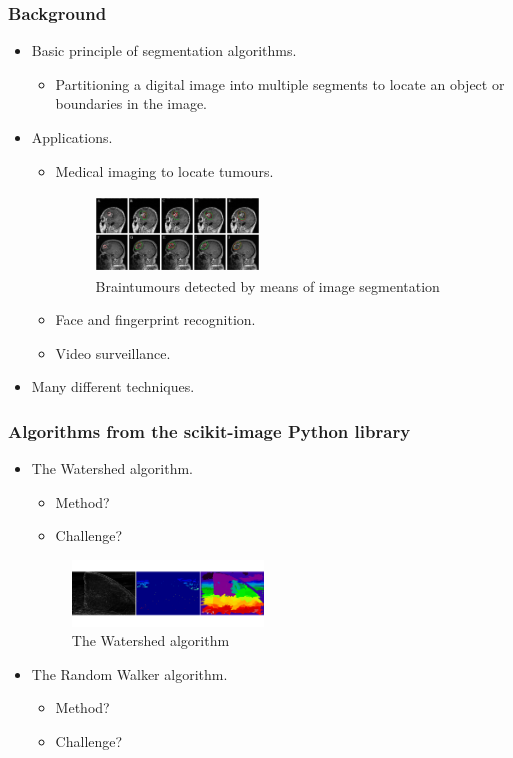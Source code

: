 \documentclass{beamer}
\newcommand{\myitem}{\item[$-$]}
\begin{document}
\begin{frame}
\frametitle{Background}
\begin{itemize}
\item Basic principle of segmentation algorithms.
\begin{itemize}
\myitem Partitioning a digital image into multiple segments to locate an object or
boundaries in the image.
\end{itemize}
\item Applications.
\begin{itemize}
\myitem Medical imaging to locate tumours.
\begin{figure}
 \centering
 \includegraphics[width=1.7in, height=0.8in]{braintumor.jpg}
 \caption{Braintumours detected by means of image segmentation}
 \end{figure}
\myitem Face and fingerprint recognition.
\myitem Video surveillance.
\end{itemize}
\item Many different techniques.
\end{itemize}
\end{frame}

\begin{frame}
\frametitle{Algorithms from the scikit-image Python library}
\begin{itemize}
\item The Watershed\cite{scikit-image} algorithm.
\begin{itemize}
\myitem Method?
\myitem Challenge?
\end{itemize}
\begin{figure}
 \centering
 \includegraphics[width=2in]{watershed.png}
 \caption{The Watershed algorithm}
 \end{figure}

\item The Random Walker\cite{scikit-image} algorithm.
\begin{itemize}
\myitem Method?
\myitem Challenge?
\end{itemize}
\end{itemize}
\end{frame}
\end{document}
